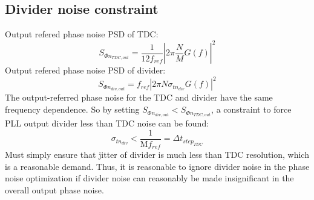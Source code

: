 	\subsection{Divider noise constraint}
		Output refered phase noise PSD of TDC:
		\begin{equation}
			S_{\Phi n_{TDC,out}} = \frac{1}{12 f_{ref}}\left|2\pi\frac{N}{M} G(f) \right|^2
		\end{equation}
		Output refered phase noise PSD of divider:
		\begin{equation}
			S_{\Phi n_{div, out}} = f_{ref} \left|2\pi N \sigma_{tn_{div}} G(f)\right|^2
		\end{equation}
		The output-referred phase noise for the TDC and divider have the same frequency dependence. So by setting $S_{\Phi n_{div, out}} < S_{\Phi n_{TDC,out}}$, a constraint to force PLL output divider less than TDC noise can be found:
		\begin{equation}
			\sigma_{tn_{div}} < \frac{1}{\mathrm{M}f_{ref}} = \Delta t_{step_{TDC}}
		\end{equation}
		Must simply ensure that jitter of divider is much less than TDC resolution, which is a reasonable demand. Thus, it is reasonable to ignore divider noise in the phase noise optimization if divider noise can reasonably be made insignificant in the overall output phase noise.

